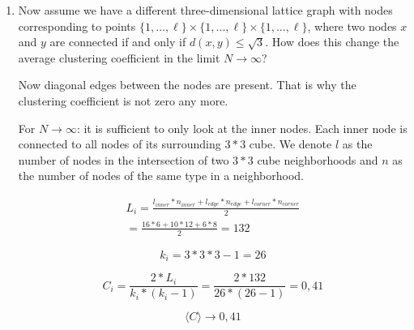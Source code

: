 \begin{enumerate}
	\item Now assume we have a different three-dimensional lattice graph with nodes corresponding to points $\{1,...,\ell\}\times\{1,...,\ell\}\times\{1,...,\ell\}$, where two nodes $x$ and $y$ are connected if and only if $d(x,y) \leq \sqrt{3}$. How does this change the average clustering coefficient in the limit $N \rightarrow \infty$?
	\vspace{0.25cm}
	
	Now diagonal edges between the nodes are present. That is why the clustering coefficient is not zero any more.
	
	For $N \rightarrow \infty$: it is sufficient to only look at the inner nodes. Each inner node is connected to all nodes of its surrounding $3*3$ cube. We denote $l$ as the number of nodes in the intersection of two $3*3$ cube neighborhoods and $n$ as the number of nodes of the same type in a neighborhood. 
	
	\begin{align*}
		L_i = \frac{l_{inner}*n_{inner} + l_{edge}*n_{edge} + l_{corner}*n_{corner}}{2} \\
		= \frac{16*6 + 10*12 + 6*8}{2} = 132
	\end{align*}
	
	\begin{equation*}
		k_i = 3*3*3-1 = 26
	\end{equation*}
	
	\begin{equation*}
		C_i = \frac{2*L_i}{k_i * (k_i-1)} = \frac{2*132}{26 * (26-1)} = 0,41
	\end{equation*}
	
	\begin{equation*}
		\langle C \rangle \rightarrow 0,41
	\end{equation*}
	
\end{enumerate}